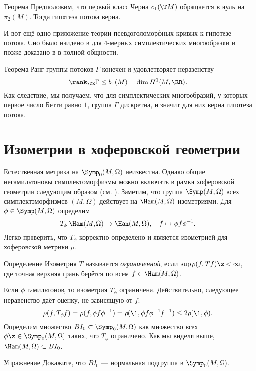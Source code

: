 \begin{thm}{Теорема}\label{14.3.A}
Предположим, что первый класс Черна $c_1(\T M)$ обращается в нуль на $\pi_2(M)$.
Тогда гипотеза потока верна.
\end{thm}


И вот ещё одно приложение теории псевдоголоморфных кривых к гипотезе потока.
Оно было найдено в \cite{LMP2} для 4-мерных симплектических многообразий и позже доказано в \cite{McD2} в полной общности.

\begin{thm}{Теорема}\label{14.3.B}
Ранг группы потоков $\Gamma$ конечен и удовлетворяет неравенству
\[\rank_\ZZ \Gamma\le b_1(M) = \dim H^1(M,\RR).\]
Как следствие, мы получаем, что для симплектических многообразий, у которых первое число Бетти равно $1$, группа $\Gamma$ дискретна, и значит для них верна гипотеза потока.
\end{thm}

\section{Изометрии в хоферовской геометрии }

Естественная метрика на $\Symp_0(M,\Omega)$ неизвестна.
Однако общие негамильтоновы симплектоморфизмы можно включить в рамки хоферовской геометрии следующим образом (см. \cite{LP}).
Заметим, что группа $\Symp(M,\Omega)$ всех симплектоморфизмов $(M,\Omega)$ действует на $\Ham(M,\Omega)$ изометриями.
Для $\phi \in \Symp(M,\Omega)$ определим 
\[T_\phi\: \Ham(M,\Omega) \to \Ham(M,\Omega),
\quad
f \mapsto \phi f\phi^{-1}.\]
Легко проверить, что $T_\phi$ корректно определено и является изометрией для хоферовской метрики $\rho$.

\begin{ex*}{Определение}
Изометрия $T$ называется \emph{ограниченной}, если $\sup \rho(f, Tf)\z<\infty$, где точная верхняя грань берётся по всем $f\in\Ham(M,\Omega)$.
\end{ex*}


Если $\phi$ гамильтонов, то изометрия $T_\phi$ ограничена.
Действительно, следующее неравенство даёт оценку, не зависящую от $f$:
\[\rho(f,T_\phi f) = \rho(f,\phi f\phi^{-1}) = \rho(\1,\phi f\phi^{-1}f^{-1})\le 2\rho(\1, \phi).\]
Определим множество $BI_0 \subset \Symp_0(M,\Omega)$ как множество всех $\phi \z\in \Symp_0(M,\Omega)$ таких, что $T_\phi$ ограничено.
Как мы видели выше, $\Ham(M,\Omega)\subset BI_0$.

\begin{ex}{Упражнение}\label{14.4.A}
Докажите, что $BI_0$ --- нормальная подгруппа в $\Symp_0(M,\Omega)$.
\end{ex}

